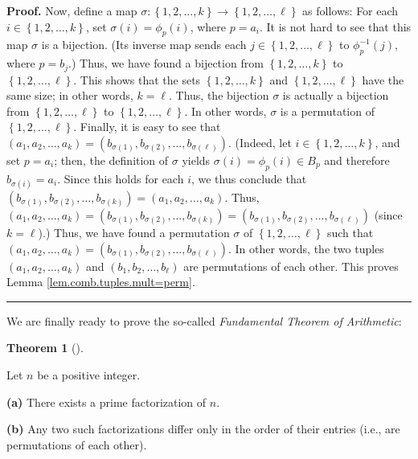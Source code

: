 \documentclass[numbers=enddot,12pt,final,onecolumn,notitlepage]{scrartcl}%
\numberwithin{exer}{subsection}
\theoremstyle{definition}
\newtheorem{theo}{Theorem}[subsection]
\newenvironment{theorem}[1][]
{\begin{theo}[#1]\begin{leftbar}}
{\end{leftbar}\end{theo}}
\newenvironment{fineprint}{\begin{small}}{\end{small}}
\newenvironment{proof}[1][Proof]{\noindent\textbf{#1.} }{\ \rule{0.5em}{0.5em}}
\begin{document}
\begin{fineprint}
\begin{proof}
Now, define a map $\sigma:\left\{  1,2,\ldots,k\right\}  \rightarrow\left\{
1,2,\ldots,\ell\right\}  $ as follows: For each $i\in\left\{  1,2,\ldots
,k\right\}  $, set $\sigma\left(  i\right)  =\phi_{p}\left(  i\right)  $,
where $p=a_{i}$. It is not hard to see that this map $\sigma$ is a bijection.
(Its inverse map sends each $j\in\left\{  1,2,\ldots,\ell\right\}  $ to
$\phi_{p}^{-1}\left(  j\right)  $, where $p=b_{j}$.) Thus, we have found a
bijection from $\left\{  1,2,\ldots,k\right\}  $ to $\left\{  1,2,\ldots
,\ell\right\}  $. This shows that the sets $\left\{  1,2,\ldots,k\right\}  $
and $\left\{  1,2,\ldots,\ell\right\}  $ have the same size; in other words,
$k=\ell$. Thus, the bijection $\sigma$ is actually a bijection from $\left\{
1,2,\ldots,\ell\right\}  $ to $\left\{  1,2,\ldots,\ell\right\}  $. In other
words, $\sigma$ is a permutation of $\left\{  1,2,\ldots,\ell\right\}  $.
Finally, it is easy to see that $\left(  a_{1},a_{2},\ldots,a_{k}\right)
=\left(  b_{\sigma\left(  1\right)  },b_{\sigma\left(  2\right)  }%
,\ldots,b_{\sigma\left(  \ell\right)  }\right)  $. (Indeed, let $i\in\left\{
1,2,\ldots,k\right\}  $, and set $p=a_{i}$; then, the definition of $\sigma$
yields $\sigma\left(  i\right)  =\phi_{p}\left(  i\right)  \in B_{p}$ and
therefore $b_{\sigma\left(  i\right)  }=a_{i}$. Since this holds for each $i$,
we thus conclude that $\left(  b_{\sigma\left(  1\right)  },b_{\sigma\left(
2\right)  },\ldots,b_{\sigma\left(  k\right)  }\right)  =\left(  a_{1}%
,a_{2},\ldots,a_{k}\right)  $. Thus, $\left(  a_{1},a_{2},\ldots,a_{k}\right)
=\left(  b_{\sigma\left(  1\right)  },b_{\sigma\left(  2\right)  }%
,\ldots,b_{\sigma\left(  k\right)  }\right)  =\left(  b_{\sigma\left(
1\right)  },b_{\sigma\left(  2\right)  },\ldots,b_{\sigma\left(  \ell\right)
}\right)  $ (since $k=\ell$).) Thus, we have found a permutation $\sigma$ of
$\left\{  1,2,\ldots,\ell\right\}  $ such that $\left(  a_{1},a_{2}%
,\ldots,a_{k}\right)  =\left(  b_{\sigma\left(  1\right)  },b_{\sigma\left(
2\right)  },\ldots,b_{\sigma\left(  \ell\right)  }\right)  $. In other words,
the two tuples $\left(  a_{1},a_{2},\ldots,a_{k}\right)  $ and $\left(
b_{1},b_{2},\ldots,b_{\ell}\right)  $ are permutations of each other. This
proves Lemma \ref{lem.comb.tuples.mult=perm}.
\end{proof}
\end{fineprint}

We are finally ready to prove the so-called \textit{Fundamental Theorem of
Arithmetic}:

\begin{theorem}
\label{thm.ent.primes.fac-uni}Let $n$ be a positive integer.

\textbf{(a)} There exists a prime factorization of $n$.

\textbf{(b)} Any two such factorizations differ only in the order of their
entries (i.e., are permutations of each other).
\end{theorem}
\end{document}

